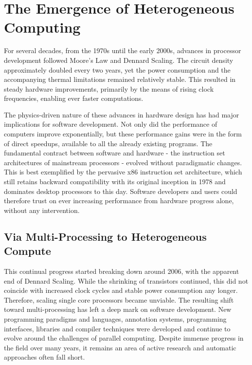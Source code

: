 \section{The Emergence of Heterogeneous Computing}

    For several decades, from the 1970s until the early 2000s, advances in
    processor development followed Moore's Law and Dennard Scaling.
    The circuit density approximately doubled every two years, yet the power
    consumption and the accompanying thermal limitations remained relatively
    stable.
    This resulted in steady hardware improvements, primarily by the means of
    rising clock frequencies, enabling ever faster computations.

    The physics-driven nature of these advances in hardware design has had major
    implications for software development.
    Not only did the performance of computers improve exponentially, but these
    performance gains were in the form of direct speedups, available to all the
    already existing programs.
    The fundamental contract between software and hardware - the
    instruction set architectures of mainstream processors - evolved without
    paradigmatic changes.
    This is best exemplified by the pervasive x86 instruction set architecture,
    which still retains backward compatibility with its original inception in
    1978 and dominates desktop processors to this day.
    Software developers and users could therefore trust on ever increasing
    performance from hardware progress alone, without any intervention.

\subsection{Via Multi-Processing to Heterogeneous Compute}

    This continual progress started breaking down around 2006, with the apparent
    end of Dennard Scaling.
    While the shrinking of transistors continued, this did not coincide with
    increased clock cycles and stable power consumption any longer.
    Therefore, scaling single core processors became unviable.
    The resulting shift toward multi-processing has left a deep mark on
    software development.
    New programming paradigms and languages, annotation systems, programming
    interfaces, libraries and compiler techniques were developed and continue to
    evolve around the challenges of parallel computing.
    Despite immense progress in the field over many years, it remains an area
    of active research and automatic approaches often fall short.

